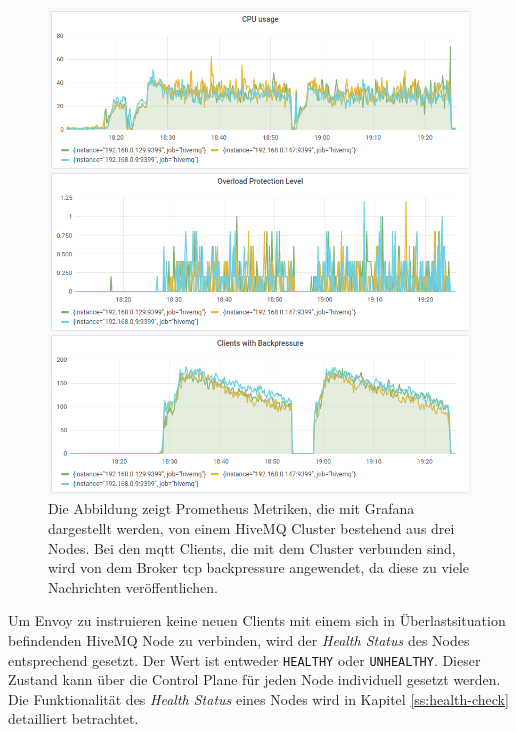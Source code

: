 \begin{figure}
    \centering
    \includegraphics[scale=0.8]{images/overload-protection.png}
    \caption{Die Abbildung zeigt Prometheus Metriken, die mit Grafana dargestellt werden, von einem HiveMQ Cluster bestehend aus drei Nodes. Bei den \ac{mqtt} Clients, die mit dem Cluster verbunden sind, wird von dem Broker \ac{tcp} backpressure angewendet, da diese zu viele Nachrichten veröffentlichen.}
    \label{fig:overload-protection}
\end{figure}
Um Envoy zu instruieren keine neuen Clients mit einem sich in Überlastsituation befindenden HiveMQ Node zu verbinden, wird der \textit{Health Status} des Nodes entsprechend gesetzt.
Der Wert ist entweder \verb|HEALTHY| oder \verb|UNHEALTHY|.
Dieser Zustand kann über die Control Plane für jeden Node individuell gesetzt werden.
\cite{HealthCheckEnvoy}
Die Funktionalität des \textit{Health Status} eines Nodes wird in Kapitel \ref{ss:health-check} detailliert betrachtet.

